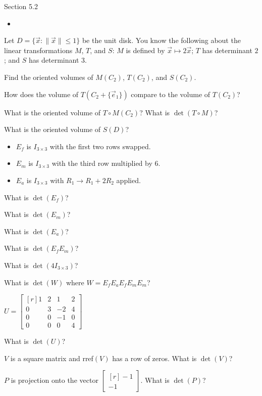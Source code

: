 \documentclass{problemset}
\newcommand{\mat}[1]{\begin{bmatrix*}[r]#1\end{bmatrix*}}
\begin{document}
\begin{lesson}
	\newpage

	Section 5.2

	\begin{itemize}
		\item 
	\end{itemize}


	\newpage
\end{lesson}
	\question
	Let $D=\{\vec x:\|\vec x\|\leq 1\}$ be the unit disk. You know the following about the 
	linear transformations $M$, $T$, and $S$: $M$ is
	defined by $\vec x\mapsto 2\vec x$; $T$ has determinant $2$; and $S$ has determinant $3$.
	\begin{parts}
		\item Find the oriented volumes of $M(C_2)$, $T(C_2)$, and $S(C_2)$.
		\item How does the volume of $T(C_2+\{\vec e_1\})$ compare to the volume 
			of $T(C_2)$?
		\item What is the oriented volume of $T\circ M(C_2)$? What is $\det(T\circ M)$?
		\item What is the oriented volume of $S(D)$?
	\end{parts}

	\question
	\begin{itemize}
		\item $E_f$ is $I_{3\times 3}$ with the first two rows swapped.
		\item $E_m$ is $I_{3\times 3}$ with the third row multiplied by 6.
		\item $E_a$ is $I_{3\times 3}$ with $R_1\to R_1+2R_2$ applied.
	\end{itemize}

	\begin{parts}
		\item What is $\det(E_f)$?
		\item What is $\det(E_m)$?
		\item What is $\det(E_a)$?
		\item What is $\det(E_fE_m)$?
		\item What is $\det(4I_{3\times 3})$?
		\item What is $\det(W)$ where $W=E_fE_aE_fE_mE_m$?
	\end{parts}

	\question
	$U=\mat{1&2&1&2\\0&3&-2&4\\0&0&-1&0\\0&0&0&4}$
	\begin{parts}
		\item What is $\det(U)$?
		\item $V$ is a square matrix and rref$(V)$ has a row of zeros.
		 What is $\det(V)$?
		\item $P$ is projection onto the vector $\mat{-1\\-1}$. What is $\det(P)$?
	\end{parts}
\end{document}
